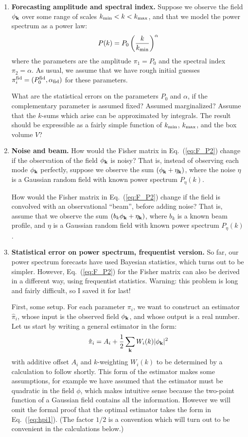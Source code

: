 \documentclass[aps,prd,superscriptaddress,groupedaddress,nofootinbib,nobibnotes]{revtex4}
\newcommand{\be}{\begin{equation}}
\newcommand{\ee}{\end{equation}}
\def\k{{\bf k}}
\def\hpi{{\hat\pi}}
\begin{document}
\begin{enumerate}
\item {\bf Forecasting amplitude and spectral index.}
  Suppose we observe the field $\phi_{\k}$ over some range of scales $k_{\rm min} < k < k_{\rm max}$,
  and that we model the power spectrum as a power law:
\be
  P(k) = P_0 \left( \frac{k}{k_{\rm min}} \right)^\alpha
\ee
  where the parameters are the amplitude $\pi_1 = P_0$ and the spectral index $\pi_2 = \alpha$.
  As usual, we assume that we have rough initial guesses $\pi_i^{\rm fid} = (P_0^{\rm fid}, \alpha_{\rm fid})$
  for these parameters.

  What are the statistical errors on the parameters $P_0$ and $\alpha$, if the complementary parameter
  is assumed fixed?  Assumed marginalized?
  Assume that the $k$-sums which arise can be approximated by integrals.
  The result should be expressible as a fairly simple function of $k_{\rm min}$, $k_{\rm max}$, and the box volume $V$?

\item {\bf Noise and beam.}
  How would the Fisher matrix in Eq.~(\ref{eq:F_P2}) change if the observation of the field $\phi_{\k}$ is noisy?
  That is, instead of observing each mode $\phi_\k$ perfectly, suppose we observe the sum $(\phi_\k + \eta_\k)$, where
  the noise $\eta$ is a Gaussian random field with known power spectrum $P_\eta(k)$.

  How would the Fisher matrix in Eq.~(\ref{eq:F_P2}) change if the field is convolved with an observational ``beam'', before adding noise?
  That is, assume that we observe the sum $(b_k \phi_\k + \eta_\k)$, where $b_k$ is a known beam profile,
  and $\eta$ is a Gaussian random field with known power spectrum $P_\eta(k)$.

\item 
  {\bf Statistical error on power spectrum, frequentist version.}
  So far, our power spectrum forecasts have used Bayesian statistics, which turns out to be simpler.
  However, Eq.~(\ref{eq:F_P2}) for the Fisher matrix can also be derived in a different way, using frequentist statistics.
  Warning: this problem is long and fairly difficult, so I saved it for last!

  First, some setup.
  For each parameter $\pi_i$, we want to construct an estimator $\hpi_i$, whose input is the observed field $\phi_{\k}$,
  and whose output is a real number.  Let us start by writing a general estimator in the form:
\be
  \hpi_i = A_i + \frac{1}{2} \sum_{\k} W_i(k) |\phi_\k|^2  \label{eq:hpi1}
\ee
  with additive offset $A_i$ and $k$-weighting $W_i(k)$ to be determined by a calculation to follow shortly.
  This form of the estimator makes some assumptions, for example we have assumed that the estimator must be quadratic
  in the field $\phi$, which makes intuitive sense because the two-point function of a Gaussian field contains all
  the information.  However we will omit the formal proof that the optimal estimator takes the form in Eq.~(\ref{eq:hpi1}).
  (The factor $1/2$ is a convention which will turn out to be convenient in the calculations below.)


\end{enumerate}
\end{document}
